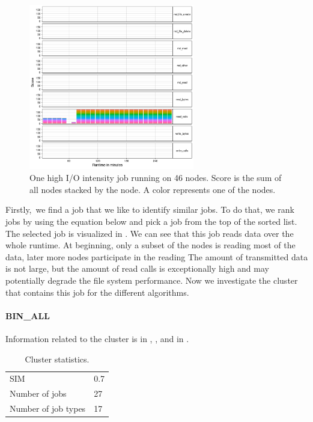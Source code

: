 \documentclass[]{llncs}
\begin{document}
\begin{figure}
  \centering
  \includegraphics[width=2.84in,height=2.85in]{./media/image1.png}
  \caption{One high I/O intensity job running on 46 nodes. Score is the sum of all nodes stacked by the node. A color represents one of the nodes.}
  \label{fig:use_case}
\end{figure}

Firstly,\ we find a job that we like to identify similar jobs.
To do that, we rank jobs by using the equation below and pick a job from the top of the sorted list.
The selected job is visualized in .
We can see that this job reads data over the whole runtime.
At beginning, only a subset of the nodes is reading most of the data, later more nodes participate in the reading The amount of transmitted data is not large, but the amount of read calls is exceptionally high and may potentially degrade the file system performance.
Now we investigate the cluster that contains this job for the different algorithms.

\paragraph{BIN\_ALL}
Information related to the cluster is in , , and in .

\begin{table}
  \centering
  \begin{tabular}{ll}
    SIM & 0.7 \\
    Number of jobs & 27 \\
    Number of job types & 17 \\
  \end{tabular}
  \caption{Cluster statistics.}
  \label{tab:use_case:bin_all:stats}
\end{table}
\end{document}
